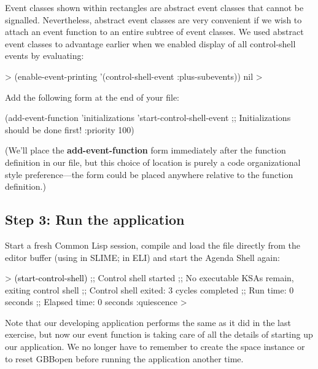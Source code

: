 \documentclass[10pt,twoside,english,pdftex]{article}
\begin{document}
\noindent Event classes shown within rectangles are abstract event classes
that cannot be signalled.  Nevertheless, abstract event classes are
very convenient if we wish to attach an event function to an entire
subtree of event classes.  We used abstract event classes to advantage
earlier when we enabled display of all control-shell events by
evaluating:
%
\begin{example}\color{darkergray}%
  > (enable-event-printing '(control-shell-event :plus-subevents))
  nil
  >
\end{example}


Add the following form at the end of your  file:
%
\begin{example}
  (add-event-function 'initializations 'start-control-shell-event
                      ;; Initializations should be done first!
                      :priority 100)
\end{example}

(We'll place the \textbf{add-event-function} form immediately after the
 function definition in our file, but this choice of
location is purely a code organizational style preference---the form could be
placed anywhere relative to the function definition.)

\subsection*{Step 3: Run the application}

%
Start a fresh Common Lisp session, compile and load the
 file directly from the editor buffer (using
 in SLIME;  in ELI) and start the Agenda Shell
again:
%
\begin{example}\color{darkergray}%
  > \textcolor{black}{(start-control-shell)}
  ;; Control shell started
  ;; No executable KSAs remain, exiting control shell
  ;; Control shell exited: 3 cycles completed
  ;; Run time: 0 seconds
  ;; Elapsed time: 0 seconds
  :quiescence
  >
\end{example}

Note that our developing application performs the same as it did in the last
exercise, but now our  event function is taking care of
all the details of starting up our application.  We no longer have to remember
to create the  space instance or to reset GBBopen before
running the application another time.
\end{document}
